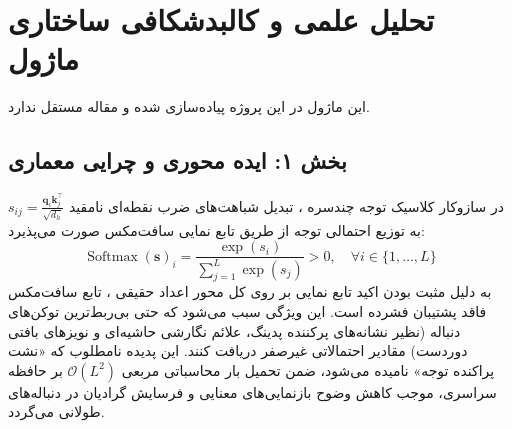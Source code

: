 \section{تحلیل علمی و کالبدشکافی ساختاری ماژول }

این ماژول در این پروژه پیاده‌سازی شده و مقاله مستقل ندارد.
\label{sec:adasplash_attention}

\subsection*{بخش ۱: ایده محوری و چرایی معماری }
در سازوکار کلاسیک توجه چندسره ، تبدیل شباهت‌های ضرب نقطه‌ای نامقید $s_{ij} = \frac{\mathbf{q}_i \mathbf{k}_j^\top}{\sqrt{d_h}}$ به توزیع احتمالی توجه از طریق تابع نمایی سافت‌مکس  صورت می‌پذیرد:
\begin{equation}
\operatorname{Softmax}(\mathbf{s})_i = \frac{\exp(s_i)}{\sum_{j=1}^L \exp(s_j)} > 0, \quad \forall i \in \{1, \dots, L\}
\end{equation}
به دلیل مثبت بودن اکید تابع نمایی بر روی کل محور اعداد حقیقی ، تابع سافت‌مکس فاقد پشتیبان فشرده  است. این ویژگی سبب می‌شود که حتی بی‌ربط‌ترین توکن‌های دنباله (نظیر نشانه‌های پرکننده پدینگ، علائم نگارشی حاشیه‌ای و نویزهای بافتی دوردست) مقادیر احتمالاتی غیرصفر دریافت کنند. این پدیده نامطلوب که «نشت پراکنده توجه»  نامیده می‌شود، ضمن تحمیل بار محاسباتی مربعی $\mathcal{O}(L^2)$ بر حافظه سراسری، موجب کاهش وضوح بازنمایی‌های معنایی و فرسایش گرادیان در دنباله‌های طولانی می‌گردد.

